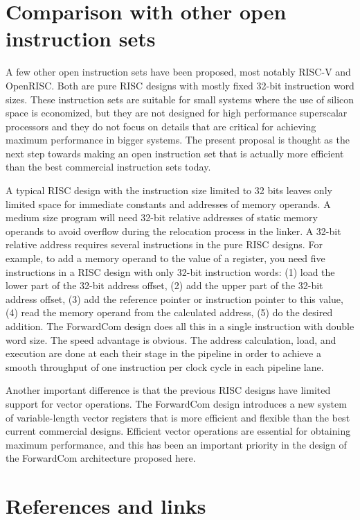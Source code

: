 \documentclass[forwardcom.tex]{subfiles}
\begin{document}
\section{Comparison with other open instruction sets}
A few other open instruction sets have been proposed, most notably RISC-V and OpenRISC. Both are pure RISC designs with mostly fixed 32-bit instruction word sizes. These instruction sets are suitable for small systems where the use of silicon space is economized, but they are not designed for high performance superscalar processors and they do not focus on details that are critical for achieving maximum performance in bigger systems. The present proposal is thought as the next step towards making an open instruction set that is actually more efficient than the best commercial instruction sets today.
\vspace{2mm}

A typical RISC design with the instruction size limited to 32 bits leaves only limited space for immediate constants and addresses of memory operands. A medium size program will need 32-bit relative addresses of static memory operands to avoid overflow during the relocation process in the linker. A 32-bit relative address requires several instructions in the pure RISC designs. For example, to add a memory operand to the value of a register, you need five instructions in a RISC design with only 32-bit instruction words: (1) load the lower part of the 32-bit address offset, (2) add the upper part of the 32-bit address offset, (3) add the reference pointer or instruction pointer to this value, (4) read the memory operand from the calculated address, (5) do the desired addition. The ForwardCom design does all this in a single instruction with double word size. The speed advantage is obvious. The address calculation, load, and execution are done at each their stage in the pipeline in order to achieve a smooth throughput of one instruction per clock cycle in each pipeline lane.
\vspace{2mm}

Another important difference is that the previous RISC designs have limited support for vector operations. The ForwardCom design introduces a new system of variable-length vector registers that is more efficient and flexible than the best current commercial designs. Efficient vector operations are essential for obtaining maximum performance, and this has been an important priority in the design of the ForwardCom architecture proposed here.

\section{References and links} \label{referencesToIntroduction}
\end{document}
